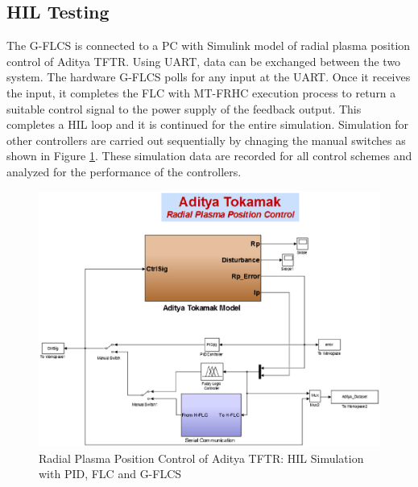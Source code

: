 \subsection{HIL Testing}
The G-FLCS is connected to a PC with Simulink model of radial plasma position control of Aditya TFTR. Using UART, data can be exchanged between the two system. The hardware G-FLCS polls for any input at the UART. Once it receives the input, it completes the FLC with MT-FRHC execution process to return a suitable control signal to the power supply of the feedback output. This completes a HIL loop and it is continued for the entire simulation. Simulation for other controllers are carried out sequentially by chnaging the manual switches as shown in Figure \ref{fig:Fig5_6}. These simulation data are recorded for all control schemes and analyzed for the performance of the controllers.
\begin{figure}[h!]
\centering
\includegraphics[width=0.95\linewidth]{Chapter5/chapter5/Fig6_AdityaSim_All}
\caption[HIL Simulation with PID, FLC\cite{Suratia2012} and G-FLCS]{Radial Plasma Position Control of Aditya TFTR: HIL Simulation with PID, FLC\cite{Suratia2012} and G-FLCS}
\label{fig:Fig5_6}
\end{figure}




